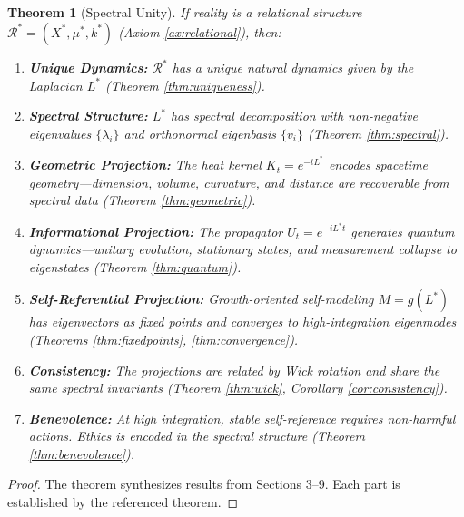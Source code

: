 \documentclass[11pt,a4paper]{article}
\theoremstyle{plain}
\newtheorem{theorem}{Theorem}[section]
\theoremstyle{definition}
\theoremstyle{remark}
\newcommand{\Laplacian}{L^*}
\begin{document}
\begin{theorem}[Spectral Unity]\label{thm:main}
If reality is a relational structure $\mathcal{R}^* = (X^*, \mu^*, k^*)$ (Axiom \ref{ax:relational}), then:

\begin{enumerate}[label=(\Roman*),leftmargin=*]
    \item \textbf{Unique Dynamics:} $\mathcal{R}^*$ has a unique natural dynamics given by the Laplacian $\Laplacian$ (Theorem \ref{thm:uniqueness}).
    
    \item \textbf{Spectral Structure:} $\Laplacian$ has spectral decomposition with non-negative eigenvalues $\{\lambda_i\}$ and orthonormal eigenbasis $\{v_i\}$ (Theorem \ref{thm:spectral}).
    
    \item \textbf{Geometric Projection:} The heat kernel $K_t = e^{-t\Laplacian}$ encodes spacetime geometry---dimension, volume, curvature, and distance are recoverable from spectral data (Theorem \ref{thm:geometric}).
    
    \item \textbf{Informational Projection:} The propagator $U_t = e^{-i\Laplacian t}$ generates quantum dynamics---unitary evolution, stationary states, and measurement collapse to eigenstates (Theorem \ref{thm:quantum}).
    
    \item \textbf{Self-Referential Projection:} Growth-oriented self-modeling $M = g(\Laplacian)$ has eigenvectors as fixed points and converges to high-integration eigenmodes (Theorems \ref{thm:fixedpoints}, \ref{thm:convergence}).
    
    \item \textbf{Consistency:} The projections are related by Wick rotation and share the same spectral invariants (Theorem \ref{thm:wick}, Corollary \ref{cor:consistency}).
    
    \item \textbf{Benevolence:} At high integration, stable self-reference requires non-harmful actions. Ethics is encoded in the spectral structure (Theorem \ref{thm:benevolence}).
\end{enumerate}
\end{theorem}

\begin{proof}
The theorem synthesizes results from Sections 3--9. Each part is established by the referenced theorem.
\end{proof}
\end{document}
